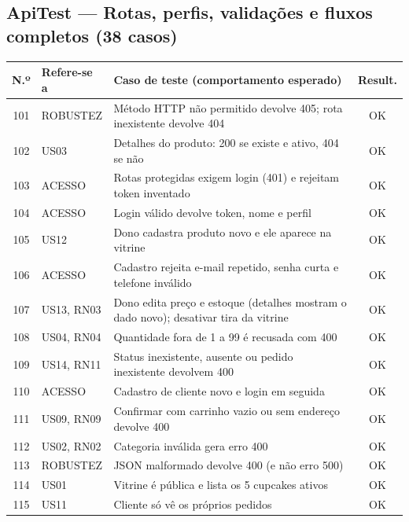 \subsection*{ApiTest --- Rotas, perfis, validações e fluxos completos (38 casos)}
\footnotesize
\begin{longtable}{|c|p{2.5cm}|p{8.4cm}|c|}
\hline
\rowcolor{gray!30} \textbf{N.º} & \textbf{Refere-se a} & \textbf{Caso de teste (comportamento esperado)} & \textbf{Result.} \\ \hline
\endhead
101 & ROBUSTEZ & Método HTTP não permitido devolve 405; rota inexistente devolve 404 & \cellcolor{green!20}OK \\ \hline
102 & US03 & Detalhes do produto: 200 se existe e ativo, 404 se não & \cellcolor{green!20}OK \\ \hline
103 & ACESSO & Rotas protegidas exigem login (401) e rejeitam token inventado & \cellcolor{green!20}OK \\ \hline
104 & ACESSO & Login válido devolve token, nome e perfil & \cellcolor{green!20}OK \\ \hline
105 & US12 & Dono cadastra produto novo e ele aparece na vitrine & \cellcolor{green!20}OK \\ \hline
106 & ACESSO & Cadastro rejeita e-mail repetido, senha curta e telefone inválido & \cellcolor{green!20}OK \\ \hline
107 & US13, RN03 & Dono edita preço e estoque (detalhes mostram o dado novo); desativar tira da vitrine & \cellcolor{green!20}OK \\ \hline
108 & US04, RN04 & Quantidade fora de 1 a 99 é recusada com 400 & \cellcolor{green!20}OK \\ \hline
109 & US14, RN11 & Status inexistente, ausente ou pedido inexistente devolvem 400 & \cellcolor{green!20}OK \\ \hline
110 & ACESSO & Cadastro de cliente novo e login em seguida & \cellcolor{green!20}OK \\ \hline
111 & US09, RN09 & Confirmar com carrinho vazio ou sem endereço devolve 400 & \cellcolor{green!20}OK \\ \hline
112 & US02, RN02 & Categoria inválida gera erro 400 & \cellcolor{green!20}OK \\ \hline
113 & ROBUSTEZ & JSON malformado devolve 400 (e não erro 500) & \cellcolor{green!20}OK \\ \hline
114 & US01 & Vitrine é pública e lista os 5 cupcakes ativos & \cellcolor{green!20}OK \\ \hline
115 & US11 & Cliente só vê os próprios pedidos & \cellcolor{green!20}OK \\ \hline

\end{longtable}
